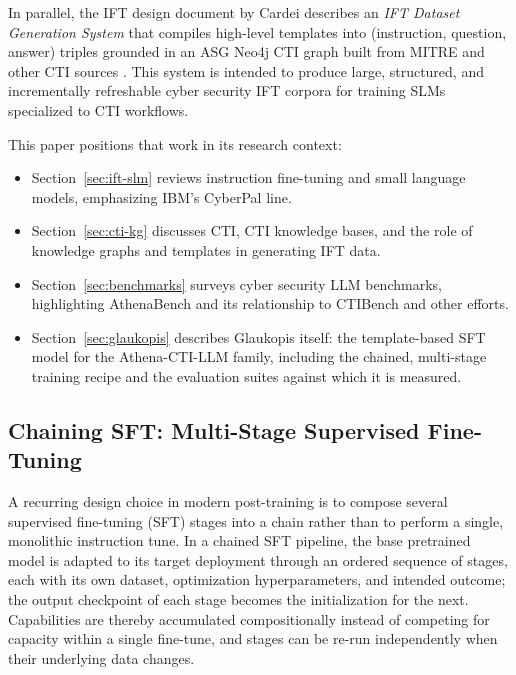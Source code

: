 \documentclass[unnumsec,webpdf,contemporary,large]{oup-authoring-template}
\theoremstyle{thmstyleone}
\theoremstyle{thmstyletwo}
\theoremstyle{thmstylethree}
\begin{document}
In parallel, the IFT design document by Cardei describes an \emph{IFT Dataset Generation System} that compiles high-level templates into (instruction, question, answer) triples grounded in an ASG Neo4j CTI graph built from MITRE and other CTI sources \cite{cardei2025ift}. This system is intended to produce large, structured, and incrementally refreshable cyber security IFT corpora for training SLMs specialized to CTI workflows.

This paper positions that work in its research context:
\begin{itemize}
  \item Section~\ref{sec:ift-slm} reviews instruction fine-tuning and small language models, emphasizing IBM's CyberPal line.
  \item Section~\ref{sec:cti-kg} discusses CTI, CTI knowledge bases, and the role of knowledge graphs and templates in generating IFT data.
  \item Section~\ref{sec:benchmarks} surveys cyber security LLM benchmarks, highlighting AthenaBench and its relationship to CTIBench and other efforts.
  \item Section~\ref{sec:glaukopis} describes Glaukopis itself: the template-based SFT model for the Athena-CTI-LLM family, including the chained, multi-stage training recipe and the evaluation suites against which it is measured.
\end{itemize}

\subsection{Chaining SFT: Multi-Stage Supervised Fine-Tuning}
\label{sec:intro-chained-sft}

A recurring design choice in modern post-training is to compose several supervised fine-tuning (SFT) stages into a chain rather than to perform a single, monolithic instruction tune. In a chained SFT pipeline, the base pretrained model is adapted to its target deployment through an ordered sequence of stages, each with its own dataset, optimization hyperparameters, and intended outcome; the output checkpoint of each stage becomes the initialization for the next. Capabilities are thereby accumulated compositionally instead of competing for capacity within a single fine-tune, and stages can be re-run independently when their underlying data changes.
\end{document}

